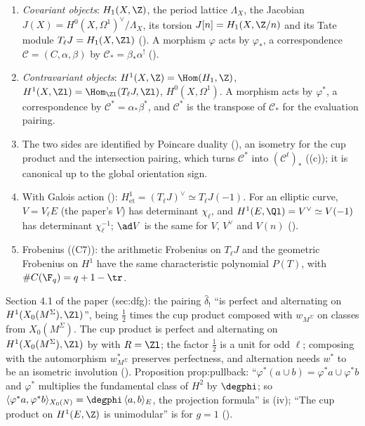\begin{convention}\label{conv:curves:duality}
\leavevmode
\begin{enumerate}[label=(\alph*)]
\item \emph{Covariant objects}: $H_1(X,\Z)$, the period lattice $\Lambda_X$, the Jacobian $J(X)=H^0(X,\Omega^1)^\vee/\Lambda_X$, its torsion $J[n]=H_1(X,\Z/n)$ and its Tate module
$T_\ell J=H_1(X,\Zl)$ (). A morphism $\varphi$ acts by $\varphi_*$, a correspondence $\mathcal C=(C,\alpha,\beta)$ by $\mathcal C_*=\beta_*\alpha^!$
().
\item \emph{Contravariant objects}: $H^1(X,\Z)=\Hom(H_1,\Z)$, $H^1(X,\Zl)=\Hom_{\Zl}(T_\ell J,\Zl)$, $H^0(X,\Omega^1)$. A morphism acts by $\varphi^*$, a correspondence by
$\mathcal C^*=\alpha_*\beta^*$, and $\mathcal C^*$ is the transpose of $\mathcal C_*$ for the evaluation pairing.
\item The two sides are identified by Poincare duality (), an isometry for the cup product and the intersection pairing, which turns $\mathcal C^*$ into
$(\mathcal C^t)_*$ ((c)); it is canonical up to the global orientation sign.
\item With Galois action (): $H^1_{\mathrm{et}}=(T_\ell J)^\vee\simeq T_\ell J(-1)$. For an elliptic curve, $V=V_\ell E$ (the paper's $V$) has determinant
$\chi_\ell$, and $H^1(E,\Ql)=V^\vee\simeq V(-1)$ has determinant $\chi_\ell^{-1}$; $\ad V$ is the same for $V$, $V^\vee$ and $V(n)$ ().
\item Frobenius ((C7)): the arithmetic Frobenius on $T_\ell J$ and the geometric Frobenius on $H^1$ have the same characteristic polynomial $P(T)$,
with $\#C(\F_q)=q+1-\tr$.
\end{enumerate}
\end{convention}

\begin{paperlink}\label{pl:curves:cup}
Section 4.1 of the paper (sec:dfg): the pairing $\hat\delta_!$ ``is perfect and alternating on $H^1(X_0(M^\Sigma),\Zl)$'', being $\frac12$ times the cup product composed with
$w_{M^\Sigma}$ on classes from $X_0(M^\Sigma)$. The cup product is perfect and alternating on $H^1(X_0(M^\Sigma),\Zl)$ by  with $R=\Zl$; the factor $\frac12$
is a unit for odd $\ell$; composing with the automorphism $w_{M^\Sigma}^*$ preserves perfectness, and alternation needs $w^*$ to be an isometric involution
(). Proposition prop:pullback: ``$\varphi^*(a\cup b)=\varphi^*a\cup\varphi^*b$ and $\varphi^*$ multiplies the fundamental class of $H^2$ by $\degphi$; so
$\langle\varphi^*a,\varphi^*b\rangle_{X_0(N)}=\degphi\,\langle a,b\rangle_E$, the projection formula'' is (iv); ``The cup product on $H^1(E,\Z)$ is unimodular''
is  for $g=1$ ().
\end{paperlink}

